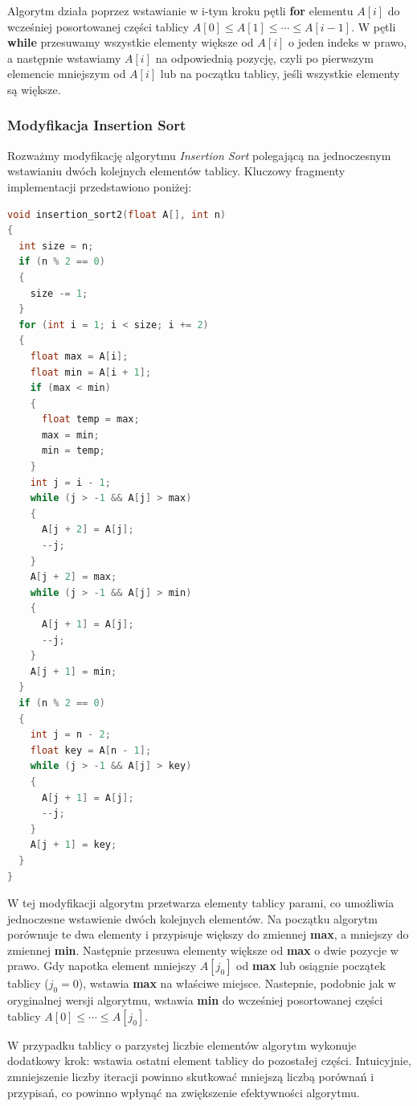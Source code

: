 \documentclass{article}
\begin{document}
Algorytm działa poprzez wstawianie w i-tym kroku pętli \textbf{for} elementu $A[i]$ do wcześniej posortowanej części tablicy $A[0] \leq A[1] \leq \cdots \leq A[i-1]$. W pętli \textbf{while} przesuwamy wszystkie elementy większe od $A[i]$ o jeden indeks w prawo, a następnie wstawiamy $A[i]$ na odpowiednią pozycję, czyli po pierwszym elemencie mniejszym od $A[i]$ lub na początku tablicy, jeśli wszystkie elementy są większe.
\subsubsection{Modyfikacja Insertion Sort}
Rozważmy modyfikację algorytmu \textit{Insertion Sort} polegającą na jednoczesnym wstawianiu dwóch kolejnych elementów tablicy. Kluczowy fragmenty implementacji przedstawiono poniżej:

\newpage

\begin{lstlisting}[style=mystyle, language=C++, caption={Implementacja Modyfikacji \texttt{Insertion Sort}}, label={lst:insertion2}]
void insertion_sort2(float A[], int n)
{
  int size = n;
  if (n % 2 == 0)
  {
    size -= 1;
  }
  for (int i = 1; i < size; i += 2)
  {
    float max = A[i];
    float min = A[i + 1];
    if (max < min)
    {
      float temp = max;
      max = min;
      min = temp;
    }
    int j = i - 1;
    while (j > -1 && A[j] > max)
    {
      A[j + 2] = A[j];
      --j;
    }
    A[j + 2] = max;
    while (j > -1 && A[j] > min)
    {
      A[j + 1] = A[j];
      --j;
    }
    A[j + 1] = min;
  }
  if (n % 2 == 0)
  {
    int j = n - 2;
    float key = A[n - 1];
    while (j > -1 && A[j] > key)
    {
      A[j + 1] = A[j];
      --j;
    }
    A[j + 1] = key;
  }
}
\end{lstlisting}
W tej modyfikacji algorytm przetwarza elementy tablicy parami, co umożliwia jednoczesne wstawienie dwóch kolejnych elementów. Na początku algorytm porównuje te dwa elementy i przypisuje większy do zmiennej \textbf{max}, a mniejszy do zmiennej \textbf{min}. Następnie przesuwa elementy większe od \textbf{max} o dwie pozycje w prawo. Gdy napotka element mniejszy $A[j_0]$ od \textbf{max} lub osiągnie początek tablicy ($j_0 = 0$), wstawia \textbf{max} na właściwe miejsce. Nastepnie, podobnie jak w oryginalnej wersji algorytmu, wstawia \textbf{min} do wcześniej posortowanej części tablicy $A[0] \leq \cdots \leq A[j_0]$.

W przypadku tablicy o parzystej liczbie elementów algorytm wykonuje dodatkowy krok: wstawia ostatni element tablicy do pozostałej części. Intuicyjnie, zmniejszenie liczby iteracji powinno skutkować mniejszą liczbą porównań i przypisań, co powinno wpłynąć na zwiększenie efektywności algorytmu.
\end{document}

